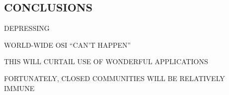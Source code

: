 \begin{bwslide}
\part*	{CONCLUSIONS}\bf

\begin{nrtc}
\item	DEPRESSING
    \begin{nrtc}
    \item	WORLD-WIDE OSI ``CAN'T HAPPEN''

    \item	THIS WILL CURTAIL USE OF WONDERFUL APPLICATIONS
    \end{nrtc}

\item	FORTUNATELY, CLOSED COMMUNITIES WILL BE RELATIVELY IMMUNE
\end{nrtc}
\end{bwslide}


